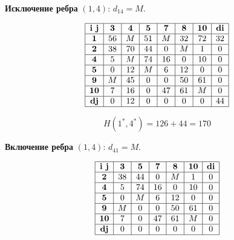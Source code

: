 \documentclass[17pt]{extarticle}
\begin{document}
\textbf{Исключение ребра} \((1,4)\): \( d_{14} = M \).

\[
    \begin{array}{|c|c|c|c|c|c|c|c|}
        \hline
        \textbf{i j} & \textbf{3} & \textbf{4} & \textbf{5} & \textbf{7} & \textbf{8} & \textbf{10} & \textbf{di} \\
        \hline
        \textbf{1}   & 56         & M          & 51         & M          & 32         & 72          & 32          \\
        \hline
        \textbf{2}   & 38         & 70         & 44         & 0          & M          & 1           & 0           \\
        \hline
        \textbf{4}   & 5          & M          & 74         & 16         & 0          & 10          & 0           \\
        \hline
        \textbf{5}   & 0          & 12         & M          & 6          & 12         & 0           & 0           \\
        \hline
        \textbf{9}   & M          & 45         & 0          & 0          & 50         & 61          & 0           \\
        \hline
        \textbf{10}  & 7          & 16         & 0          & 47         & 61         & M           & 0           \\
        \hline
        \textbf{dj}  & 0          & 12         & 0          & 0          & 0          & 0           & 44          \\
        \hline
    \end{array}
\]

\[ H(1^*,4^*) = 126 + 44 = 170 \]

\textbf{Включение ребра} \((1,4)\): \( d_{41} = M \).

\[
    \begin{array}{|c|c|c|c|c|c|c|}
        \hline
        \textbf{i j} & \textbf{3} & \textbf{5} & \textbf{7} & \textbf{8} & \textbf{10} & \textbf{di} \\
        \hline
        \textbf{2}   & 38         & 44         & 0          & M          & 1           & 0           \\
        \hline
        \textbf{4}   & 5          & 74         & 16         & 0          & 10          & 0           \\
        \hline
        \textbf{5}   & 0          & M          & 6          & 12         & 0           & 0           \\
        \hline
        \textbf{9}   & M          & 0          & 0          & 50         & 61          & 0           \\
        \hline
        \textbf{10}  & 7          & 0          & 47         & 61         & M           & 0           \\
        \hline
        \textbf{dj}  & 0          & 0          & 0          & 0          & 0           & 0           \\
        \hline
    \end{array}
\]
\end{document}
